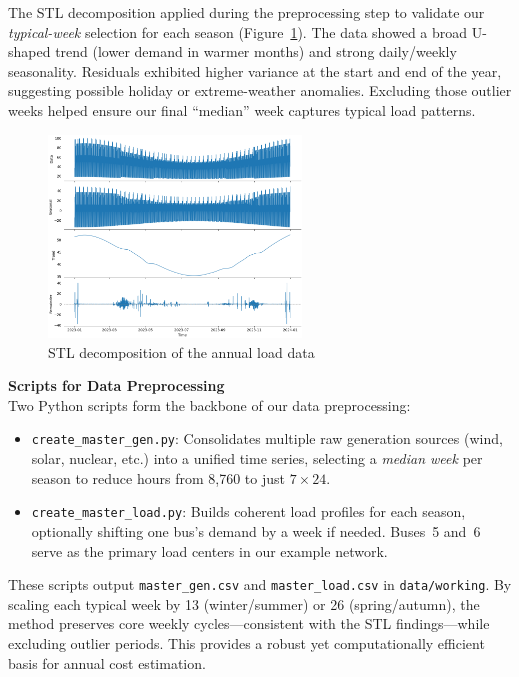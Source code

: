 The STL decomposition applied during the preprocessing step to validate our \emph{typical-week} selection for each 
season (Figure~\ref{fig:stl_load_decomposition}). The data showed a broad U-shaped trend (lower demand in warmer months) and 
strong daily/weekly seasonality. Residuals exhibited higher variance at the start and end of the year, suggesting 
possible holiday or extreme-weather anomalies. Excluding those outlier weeks helped ensure our final “median” week 
captures typical load patterns.

\begin{figure}[H]
    \centering
    \includegraphics[width=0.6\textwidth]{images/stl-load.png}
    \caption{STL decomposition of the annual load data}
    \label{fig:stl_load_decomposition}
\end{figure}

\textbf{Scripts for Data Preprocessing} \\
Two Python scripts form the backbone of our data preprocessing:

\begin{itemize}
  \item \texttt{create\_master\_gen.py}:
  Consolidates multiple raw generation sources (wind, solar, 
  nuclear, etc.) into a unified time series, selecting a \emph{median week} per season to reduce 
  hours from 8,760 to just $7 \times 24$.

  \item \texttt{create\_master\_load.py}: 
  Builds coherent load profiles for each season, optionally shifting one bus’s demand by a week if needed.
  Buses~5 and~6 serve as the primary load centers in our example network.
\end{itemize}

These scripts output \texttt{master\_gen.csv} and \texttt{master\_load.csv} in \texttt{data/working}.
By scaling each typical week by 13 (winter/summer) or 26 (spring/autumn), the method preserves core 
weekly cycles—consistent with the STL findings—while excluding outlier periods. This provides a 
robust yet computationally efficient basis for annual cost estimation.

